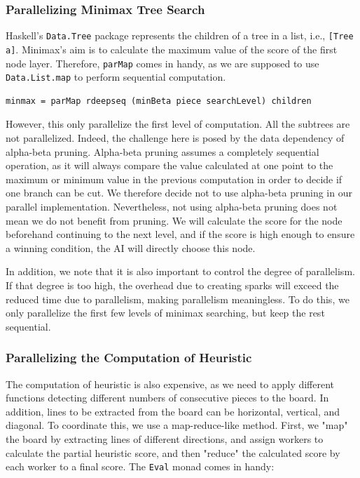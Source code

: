 \documentclass[twoside,11pt]{homework}
\begin{document}
\subsubsection{Parallelizing Minimax Tree Search}
Haskell's \texttt{Data.Tree} package represents the children of a tree in a list, i.e., \texttt{[Tree a]}. Minimax's aim is to calculate the maximum value of the score of the first node layer. Therefore, \texttt{parMap} comes in handy, as we are supposed to use \texttt{Data.List.map} to perform sequential computation.
\begin{verbatim}
minmax = parMap rdeepseq (minBeta piece searchLevel) children
\end{verbatim}

However, this only parallelize the first level of computation. All the subtrees are not parallelized. Indeed, the challenge here is posed by the data dependency of alpha-beta pruning. Alpha-beta pruning assumes a completely sequential operation, as it will always compare the value calculated at one point to the maximum or minimum value in the previous computation in order to decide if one branch can be cut. We therefore decide not to use alpha-beta pruning in our parallel implementation. Nevertheless, not using alpha-beta pruning does not mean we do not benefit from pruning. We will calculate the score for the node beforehand continuing to the next level, and if the score is high enough to ensure a winning condition, the AI will directly choose this node.

In addition, we note that it is also important to control the degree of parallelism. If that degree is too high, the overhead due to creating sparks will exceed the reduced time due to parallelism, making parallelism meaningless. To do this, we only parallelize the first few levels of minimax searching, but keep the rest sequential.

\subsubsection{Parallelizing the Computation of Heuristic}
The computation of heuristic is also expensive, as we need to apply different functions detecting different numbers of consecutive pieces to the board. In addition, lines to be extracted from the board can be horizontal, vertical, and diagonal. To coordinate this, we use a map-reduce-like method. First, we "map" the board by extracting lines of different directions, and assign workers to calculate the partial heuristic score, and then "reduce" the calculated score by each worker to a final score. The \texttt{Eval} monad comes in handy:
\end{document}
